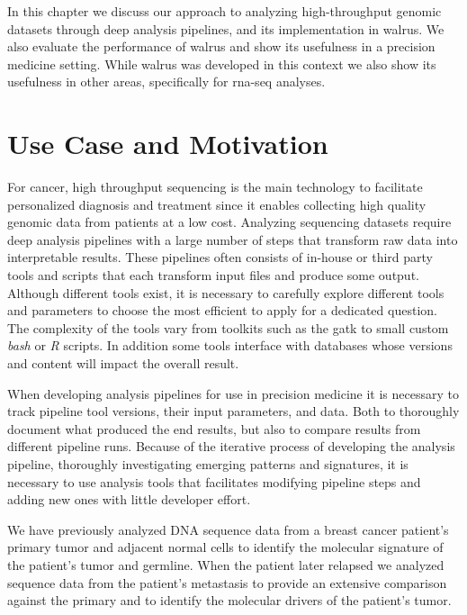 In this chapter we discuss our approach to analyzing high-throughput genomic
datasets through deep analysis pipelines, and its implementation in 
walrus.\cite{walrus} We also evaluate the performance of walrus and show its
usefulness in a precision medicine setting. While walrus was developed in this
context we also show its usefulness in other areas, specifically for
\gls{rna}-seq analyses. 

\section{Use Case and Motivation} 
For cancer, high throughput sequencing is the main technology to facilitate
personalized diagnosis and treatment since it enables collecting high quality
genomic data from patients at a low cost. 
Analyzing sequencing datasets require deep analysis pipelines with a large
number of steps that transform raw data into interpretable
results.\cite{diao2015building} These pipelines often consists of in-house or
third party tools and scripts that each transform input files and produce some
output. Although different tools exist, it is necessary to carefully explore
different tools and parameters to choose the most efficient to apply for a
dedicated question.\cite{servant2014bioinformatics} The complexity of the tools
vary from toolkits such as the \gls{gatk} to small custom \emph{bash} or
\emph{R} scripts.  In addition some tools interface with databases whose
versions and content will impact the overall result.\cite{sboner2015primer}

When developing analysis pipelines for use in precision medicine it is necessary
to track pipeline tool versions, their input parameters, and data. Both to
thoroughly document what produced the end results, but also to compare results
from different pipeline runs.  Because of the iterative process of developing
the analysis pipeline, thoroughly investigating emerging patterns and
signatures, it is necessary to use analysis tools that facilitates modifying
pipeline steps and adding new ones with little developer effort. 

We have previously analyzed DNA sequence data from a breast cancer patient's
primary tumor and adjacent normal cells to identify the molecular signature of
the patient's tumor and germline. When the patient later relapsed we analyzed
sequence data from the patient's metastasis to provide an extensive comparison
against the primary and to identify the molecular drivers of the patient's
tumor. 

